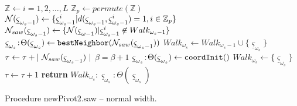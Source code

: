 \begin{algorithm}[t!]
\begin{algorithmic}[1]
\STATE $\mathbb{Z} \gets i = 1,2, \ldots ,L $ 
\STATE $\mathbb{Z}_p \gets permute(\mathbb{Z}) $ 
\STATE ${\cal N} ({\underline \varsigma}_{\omega_{s} -1}) \gets  \{{\underline \varsigma}_{\omega_{s} -1}^i | d({\underline \varsigma}_{\omega_{s} -1}, {\underline \varsigma}_{\omega_{s} -1}^i ) = 1, i \in \mathbb{Z}_p\}$ 
\STATE ${\cal N}_{saw} ({\underline \varsigma}_{\omega_{s} -1}) \gets  \{ {\cal N} ({\underline \varsigma}_{\omega -1}) |
                      {\underline \varsigma}_{\omega_{s} -1}^i \not\in  Walk_{\omega_{s} -1}\}$
        \STATE ${\underline \varsigma}_{\omega_{s}}\!:\!\Theta({\underline \varsigma}_{\omega_{s}}) \gets {\tt bestNeighbor}({\cal N}_{saw} ({\underline \varsigma}_{\omega_{s} -1}))$
        \STATE $Walk_{\omega_{s}} \gets Walk_{\omega_{s}-1} \cup \{{\underline \varsigma}_{\omega_{s}}\}$
        \STATE $\tau \gets \tau + |~{\cal N}_{saw} ({\underline \varsigma}_{\omega_{s} -1})~| $ 
        \STATE $\beta = \beta + 1$ 
        \STATE ${\underline \varsigma}_{\omega_{s}}\!:\!\Theta({\underline \varsigma}_{\omega_{s}}) \gets {\tt coordInit}()$ 
        \STATE $Walk_{\omega_{s}} \gets \{ {\underline \varsigma}_{\omega_{s}} \}$
        \STATE $\tau \gets \tau + 1 $ 
    \ENDIF
\STATE \textbf{return} $Walk_{\omega_{s}}\!:\!{\underline \varsigma}_{\omega_{s}}\!:\!\Theta({\underline \varsigma}_{\omega_{s}})$ 
\ENDPROCEDURE 
\end{algorithmic}
\caption[Algorithm file: alg-newPivot2-normal.tex]{Procedure newPivot2.saw -- normal width.}
\label{alg-newPivot2-normal}
\end{algorithm}